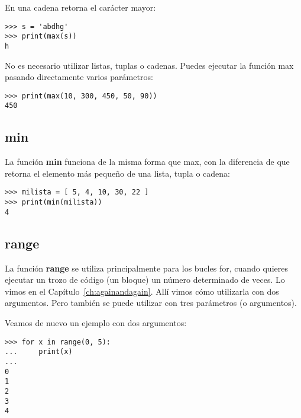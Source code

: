 \noindent
En una cadena retorna el carácter mayor:

\begin{listing}
\begin{verbatim}
>>> s = 'abdhg'
>>> print(max(s))
h
\end{verbatim}
\end{listing}

\noindent
No es necesario utilizar listas, tuplas o cadenas.  Puedes ejecutar la función max pasando directamente varios parámetros:

\begin{listing}
\begin{verbatim}
>>> print(max(10, 300, 450, 50, 90))
450
\end{verbatim}
\end{listing}

\subsection*{min}

La función \textbf{min} funciona de la misma forma que max, con la diferencia de que retorna el elemento más pequeño de una lista, tupla o cadena:

\begin{listing}
\begin{verbatim}
>>> milista = [ 5, 4, 10, 30, 22 ]
>>> print(min(milista))
4
\end{verbatim}
\end{listing}

\subsection*{range}

La función \textbf{range} se utiliza principalmente para los bucles for, cuando quieres ejecutar un trozo de código (un bloque) un número determinado de veces.   Lo vimos en el Capítulo~\ref{ch:againandagain}. Allí vimos cómo utilizarla con dos argumentos. Pero también se puede utilizar con tres parámetros (o argumentos).

Veamos de nuevo un ejemplo con dos argumentos:

\begin{listing}
\begin{verbatim}
>>> for x in range(0, 5):
...     print(x)
... 
0
1
2
3
4
\end{verbatim}
\end{listing}

